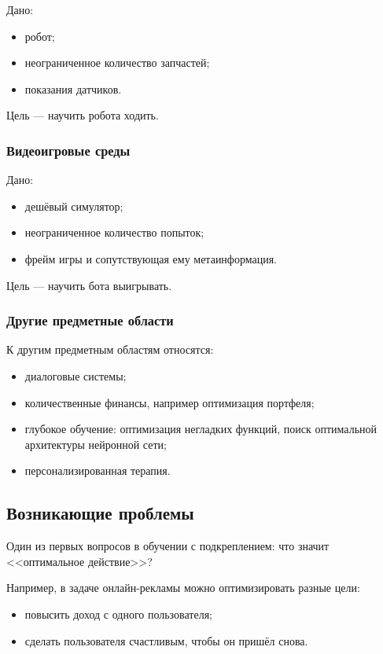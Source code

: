 \documentclass[12pt,a4paper]{article}
\begin{document}
Дано:
\begin{itemize}
    \item робот;
    \item неограниченное количество запчастей;
    \item показания датчиков.
\end{itemize}

Цель --- научить робота ходить.

\subsubsection{Видеоигровые среды}

Дано:
\begin{itemize}
    \item дешёвый симулятор;
    \item неограниченное количество попыток;
    \item фрейм игры и сопутствующая ему метаинформация.
\end{itemize}

Цель --- научить бота выигрывать.

\subsubsection{Другие предметные области}

К другим предметным областям относятся:
\begin{itemize}
    \item диалоговые системы;
    \item количественные финансы, например оптимизация портфеля;
    \item глубокое обучение: оптимизация негладких функций, поиск оптимальной архитектуры нейронной сети;
    \item персонализированная терапия.
\end{itemize}

\subsection{Возникающие проблемы}

Один из первых вопросов в обучении с подкреплением: что значит <<оптимальное действие>>?

Например, в задаче онлайн-рекламы можно оптимизировать разные цели:
\begin{itemize}
    \item повысить доход с одного пользователя;
    \item сделать пользователя счастливым, чтобы он пришёл снова.
\end{itemize}
\end{document}
